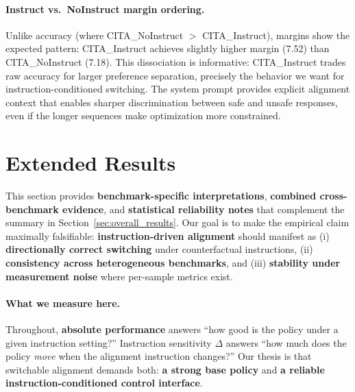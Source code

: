 \paragraph{Instruct vs.\ NoInstruct margin ordering.}
Unlike accuracy (where \textsc{CITA}\_NoInstruct $>$ \textsc{CITA}\_Instruct), margins show the expected pattern: \textsc{CITA}\_Instruct achieves slightly higher margin (7.52) than \textsc{CITA}\_NoInstruct (7.18).
This dissociation is informative: \textsc{CITA}\_Instruct trades raw accuracy for larger preference separation, precisely the behavior we want for instruction-conditioned switching.
The system prompt provides explicit alignment context that enables sharper discrimination between safe and unsafe responses, even if the longer sequences make optimization more constrained.









\section{Extended Results}
\label{sec:appendix_extended_results}

This section provides \textbf{benchmark-specific interpretations}, \textbf{combined cross-benchmark evidence}, and \textbf{statistical reliability notes} that complement the summary in Section~\ref{sec:overall_results}.
Our goal is to make the empirical claim maximally falsifiable:
\textbf{instruction-driven alignment} should manifest as (i) \textbf{directionally correct switching} under counterfactual instructions, (ii) \textbf{consistency across heterogeneous benchmarks}, and (iii) \textbf{stability under measurement noise} where per-sample metrics exist.

\vspace{-0.3em}
\paragraph{\textbf{What we measure here.}}
Throughout, \textbf{absolute performance} answers ``how good is the policy under a given instruction setting?''
Instruction sensitivity $\Delta$ answers ``how much does the policy \emph{move} when the alignment instruction changes?''
Our thesis is that switchable alignment demands both:
\textbf{a strong base policy} and \textbf{a reliable instruction-conditioned control interface}.

